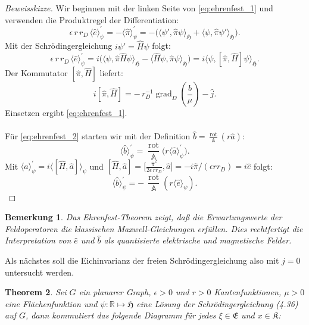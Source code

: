 \documentclass[11pt,a4paper,leqno]{report}
\newtheorem{theorem}{Theorem}[chapter]
\newtheorem{remark}[theorem]{Bemerkung}
\numberwithin{equation}{chapter}
\begin{document}
\begin{proof}[Beweisskizze]
	Wir beginnen mit der linken Seite von \eqref{eq:ehrenfest_1} und verwenden die 
	Produktregel der Differentiation:
	\[
	\epsilon\, r\, r_D\,\langle \hat{e} \rangle_\psi^\prime 
	= -\langle \hat{\pi} \rangle_\psi^\prime 
	= -\bigl(\langle \psi', \hat{\pi}\psi \rangle_{\mathfrak{H}} 
	+ \langle \psi, \hat{\pi}\psi' \rangle_{\mathfrak{H}}\bigr).
	\]
	Mit der Schrödingergleichung \(i\psi' = \hat{H}\psi\) folgt:
	\[
	\epsilon\, r\, r_D\, \langle \hat{e} \rangle_\psi^\prime 
	= i\bigl(\langle \psi, \hat{\pi}\hat{H}\psi \rangle_{\mathfrak{H}}
	- \langle \hat{H}\psi, \hat{\pi}\psi \rangle_{\mathfrak{H}}\bigr)
	= i\langle \psi, [\hat{\pi}, \hat{H}]\psi \rangle_{\mathfrak{H}}.
	\]
	Der Kommutator \([\hat{\pi}, \hat{H}]\) liefert:
	\[
	i[\hat{\pi}, \hat{H}] 
	= -\,r_D^{-1}\operatorname{grad}_D\!\left(\frac{\hat{b}}{\mu}\right) - \hat{j}.
	\]
	Einsetzen ergibt \eqref{eq:ehrenfest_1}.\\
	\\
	Für \eqref{eq:ehrenfest_2} starten wir mit der Definition \(\hat{b} = \frac{\operatorname{rot}}{\mathbb{A}}(r\hat{a})\):
	\[
	\langle \hat{b} \rangle_\psi^\prime 
	= \frac{\operatorname{rot}}{\mathbb{A}}\bigl(r\langle \hat{a} \rangle_\psi^\prime\bigr).
	\]
	Mit \(\langle \hat{a} \rangle_\psi^\prime = i\langle [\hat{H}, \hat{a}] \rangle_\psi\) und 
	\([\hat{H}, \hat{a}] = \bigl[\frac{\hat{\pi}^2}{2\epsilon\, rr_D},\hat{a}\bigr]=-i\hat{\pi}/(\epsilon rr_D) = i\hat{e}\) folgt:
	\[
	\langle \hat{b} \rangle_\psi^\prime 
	= -\,\frac{\operatorname{rot}}{\mathbb{A}}(r\langle \hat{e} \rangle_\psi).
	\]
\end{proof}
\noindent
\begin{remark}
	Das Ehrenfest-Theorem zeigt, daß die Erwartungswerte der Feldoperatoren die 
	klassischen Maxwell-Gleichungen erfüllen. Dies rechtfertigt die Interpretation 
	von \(\hat{e}\) und \(\hat{b}\) als quantisierte elektrische und magnetische Felder.
\end{remark}
\noindent
\iffalse
Als n\"achstes soll die Eichinvarianz der freien Schr\"odingergleichung also mit $\hat{j}=0$ untersucht werden.
\begin{theorem}
	Sei $G$ ein planarer Graph, $\epsilon>0$ und $r>0$ Kantenfunktionen, $\mu>0$ eine Fl\"achenfunktion und $\psi: \mathbb{R}\mapsto \mathfrak{H}$ eine L\"osung der Schr\"odingergleichung (4.36) auf $G$, dann kommutiert das folgende Diagramm f\"ur jedes $\xi\in\mathfrak{E}$ und $x\in\mathfrak{K}$:\\
\end{theorem}
\end{document}
